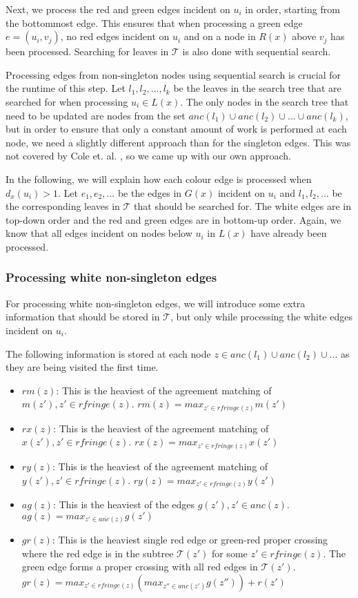 Next, we process the red and green edges incident on $u_i$ in order, starting from the bottommost edge. This ensures that when processing a green edge $e=(u_i,v_j)$, no red edges incident on $u_i$ and on a node in $R(x)$ above $v_j$ has been processed. Searching for leaves in $\mathcal{T}$ is also done with sequential search.

Processing edges from non-singleton nodes using sequential search is crucial for the runtime of this step. Let ${l_1, l_2, ..., l_k}$ be the leaves in the search tree that are searched for when processing $u_i \in L(x)$. The only nodes in the search tree that need to be updated are nodes from the set ${anc(l_1) \cup anc(l_2) \cup ... \cup anc(l_k)}$, but in order to ensure that only a constant amount of work is performed at each node, we need a slightly different approach than for the singleton edges. This was not covered by Cole et. al. \cite{nlogn}, so we came up with our own approach.

In the following, we will explain how each colour edge is processed when $d_x(u_i) > 1$. Let $e_1, e_2, ...$ be the edges in $G(x)$ incident on $u_i$ and $l_1, l_2, ...$ be the corresponding leaves in $\mathcal{T}$ that should be searched for. The white edges are in top-down order and the red and green edges are in bottom-up order. Again, we know that all edges incident on nodes below $u_i$ in $L(x)$ have already been processed.

\subsubsection{Processing white non-singleton edges}
For processing white non-singleton edges, we will introduce some extra information that should be stored in $\mathcal{T}$, but only while processing the white edges incident on $u_i$.

The following information is stored at each node $z \in {anc(l_1) \cup anc(l_2) \cup ... }$ as they are being visited the first time.

\begin{itemize}
	\item $rm(z)$: This is the heaviest of the agreement matching of $m(z'), z' \in rfringe(z)$.
		\subitem $rm(z) = max_{z'\in rfringe(z)} m(z')$
	\item $rx(z)$: This is the heaviest of the agreement matching of $x(z'), z' \in rfringe(z)$.
		\subitem $rx(z) = max_{z'\in rfringe(z)} x(z')$
	\item $ry(z)$: This is the heaviest of the agreement matching of $y(z'), z' \in rfringe(z)$.
		\subitem $ry(z) = max_{z'\in rfringe(z)} y(z')$
	\item $ag(z)$: This is the heaviest of the edges $g(z'), z' \in anc(z)$.
		\subitem $ag(z) = max_{z'\in anc(z)} g(z')$
	\item $gr(z)$: This is the heaviest single red edge or green-red proper crossing where the red edge is in the subtree $\mathcal{T}(z')$ for some $z' \in rfringe(z)$. The green edge forms a proper crossing with all red edges in $\mathcal{T}(z')$.
		\subitem $gr(z) = max_{z'\in rfringe(z)} (max_{z''\in anc(z')} g(z'')) + r(z')$
\end{itemize}

